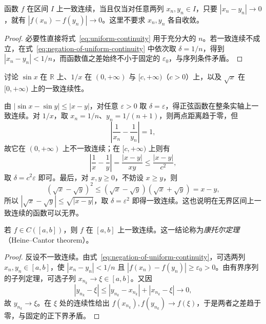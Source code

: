 \begin{theorem}[一致连续的序列判据]
\label{thm:sequential-criterion-uniform-continuity}
函数 $f$ 在区间 $I$ 上一致连续，当且仅当对任意两列 $x_n,y_n\in I$，只要 $|x_n-y_n|\to0$，就有 $|f(x_n)-f(y_n)|\to0$。这里不要求 $x_n,y_n$ 各自收敛。
\end{theorem}

\begin{proof}
必要性直接将式~\eqref{eq:uniform-continuity} 用于充分大的 $n$。若一致连续不成立，在式~\eqref{eq:negation-of-uniform-continuity} 中依次取 $\delta=1/n$，得到 $|x_n-y_n|<1/n$，而函数值之差始终不小于固定的 $\varepsilon_0$，与序列条件矛盾。
\end{proof}

\begin{example}
\label{ex:uniform-continuity-examples}
讨论 $\sin x$ 在 $\mathbb{R}$ 上、$1/x$ 在 $(0,+\infty)$ 与 $[c,+\infty)$（$c>0$）上，以及 $\sqrt{x}$ 在 $[0,+\infty)$ 上的一致连续性。
\end{example}

\begin{solve}
由 $|\sin x-\sin y|\leq|x-y|$，对任意 $\varepsilon>0$ 取 $\delta=\varepsilon$，得正弦函数在整条实轴上一致连续。对 $1/x$，取 $x_n=1/n$、$y_n=1/(n+1)$，则两点距离趋于零，但
\[
    \left|\frac1{x_n}-\frac1{y_n}\right|=1,
\]
故它在 $(0,+\infty)$ 上不一致连续；在 $[c,+\infty)$ 上则有
\[
    \left|\frac1x-\frac1y\right|=\frac{|x-y|}{xy}\leq\frac{|x-y|}{c^2},
\]
取 $\delta=c^2\varepsilon$ 即可。最后，对 $x,y\geq0$，不妨设 $x\geq y$，则
\[
    (\sqrt{x}-\sqrt{y})^2\leq(\sqrt{x}-\sqrt{y})(\sqrt{x}+\sqrt{y})=x-y,
\]
所以 $|\sqrt{x}-\sqrt{y}|\leq\sqrt{|x-y|}$，取 $\delta=\varepsilon^2$ 即得一致连续。这也说明在无界区间上一致连续的函数可以无界。
\end{solve}

\begin{theorem}[康托尔定理]
\label{thm:heine-cantor-uniform-continuity}
若 $f\in C([a,b])$，则 $f$ 在 $[a,b]$ 上一致连续。这一结论称为\emph{康托尔定理}（Heine--Cantor theorem）。
\end{theorem}

\begin{proof}
反设不一致连续。由式~\eqref{eq:negation-of-uniform-continuity}，可选两列 $x_n,y_n\in[a,b]$，使 $|x_n-y_n|<1/n$ 且 $|f(x_n)-f(y_n)|\geq\varepsilon_0>0$。由有界序列的子列定理，可选子列 $x_{n_k}\to\xi\in[a,b]$。又因
\[
    |y_{n_k}-\xi|\leq|y_{n_k}-x_{n_k}|+|x_{n_k}-\xi|\to0,
\]
故 $y_{n_k}\to\xi$。在 $\xi$ 处的连续性给出 $f(x_{n_k}),f(y_{n_k})\to f(\xi)$，于是两者之差趋于零，与固定的正下界矛盾。
\end{proof}


